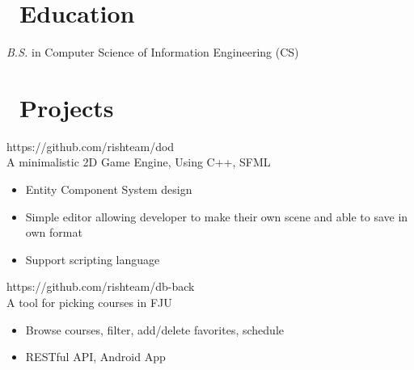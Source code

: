 \documentclass{resume}
\begin{document}



\section{\faGraduationCap\ Education}

\textit{B.S.} in  Computer Science of Information Engineering (CS)



\section{\faTasks\ Projects}

{\small https://github.com/rishteam/dod} \\
A minimalistic 2D Game Engine, Using C++, SFML
\begin{itemize}
  \item Entity Component System design
  \item Simple editor allowing developer to make their own scene and able to save in own format
  \item Support scripting language
\end{itemize}

{\small https://github.com/rishteam/db-back} \\
A tool for picking courses in FJU
\begin{itemize}
  \item Browse courses, filter, add/delete favorites, schedule
  \item RESTful API, Android App
\end{itemize}
\end{document}
